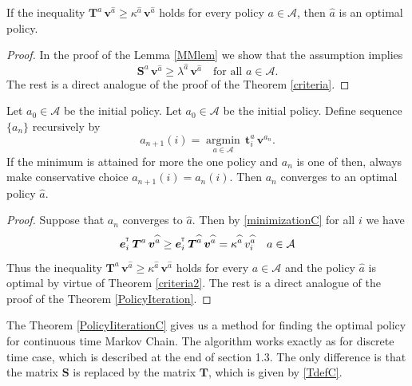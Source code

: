 \begin{thm}
If the inequality $\bm{T}^a\,\bm{v}^{\widehat{a}}\geq\kappa^{\widehat{a}}\,\bm{v}^{\widehat{a}}$ holds for every policy $a\in\mathcal{A}$, then $\widehat{a}$ is an optimal policy.
\end{thm}
\begin{proof}
In the proof of the Lemma \ref{MMlem} we show that the assumption implies  
\[\bm{S}^a\,\bm{v}^{\widehat{a}}\geq\lambda^{\widehat{a}}\,\bm{v}^{\widehat{a}} \quad \text{for all  $a\in\mathcal{A}$.}\]
The rest is a direct analogue of the proof of the Theorem \ref{criteria}.
\end{proof}
\begin{thm}
\label{PolicyIiterationC}
Let $a_{0}\in\mathcal{A}$ be the initial policy. Let $a_{0}\in\mathcal{A}$ be the initial policy. Define sequence $\{a_n\}$ recursively by 
\begin{equation}
\label{minimizationC}
a_{n+1}(i)=\underset{a\in\mathcal{A}}{\operatorname{argmin}}\,\bm{t}^a_i\,\bm{v}^{a_n}.
\end{equation}
If the minimum is attained for more the one policy and $a_n$ is one of then, always make conservative choice $a_{n+1}(i)=a_{n}(i)$. Then $a_n$ converges to an optimal policy $\widehat{a}$.
\end{thm}
\begin{proof} 
Suppose that $a_n$ converges to $\widehat{a}$. Then by \eqref{minimizationC} for all $i$ we have
\begin{equation*}
\label{problemeq}
\mbox{\boldmath{$e$}}_i^{^{_\texttt T}}\,\mbox{\boldmath{$T$}}^a\,\mbox{\boldmath{$v$}}^{\widehat{a}}\geq \mbox{\boldmath{$e$}}_i^{^{_\texttt T}}\,\mbox{\boldmath{$T$}}^{\widehat{a}}\,\mbox{\boldmath{$v$}}^{\widehat{a}}=\kappa^{\widehat{a}}\,v_i^{\widehat{a}} \quad a\in\mathcal{A}
\end{equation*}
Thus the inequality $\bm{T}^a\,\bm{v}^{\widehat{a}}\geq\kappa^{\widehat{a}}\,\bm{v}^{\widehat{a}}$ holds for every $a\in\mathcal{A}$ and the policy $\widehat{a}$ is optimal by virtue of Theorem \ref{criteria2}. %
The rest is a direct analogue of the proof of the Theorem \ref{PolicyIteration}.
\end{proof}

The Theorem \ref{PolicyIiterationC} gives us a method for finding the optimal policy for continuous time Markov Chain. The algorithm works exactly as for discrete time case, which is described at the end of section 1.3. The only difference is that the matrix $\bm{S}$ is replaced by the matrix $\bm{T}$, which is given by \eqref{TdefC}.



